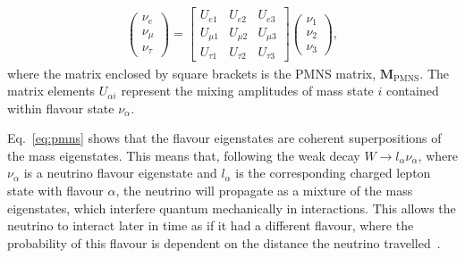 \documentclass[aps,pra,12pt,notitlepage,tightenlines]{revtex4-1}
\newcommand\matr[1]{\bm{#1}}
\begin{document}
\begin{gather}
\label{eq:pmns}
 \begin{pmatrix}
 \nu_e \\
 \nu_\mu \\
 \nu_\tau 
 \end{pmatrix}
 =
 \begin{bmatrix}
 U_{e1} & U_{e2} & U_{e3} \\
 U_{\mu1} & U_{\mu2} & U_{\mu3} \\
 U_{\tau1} & U_{\tau2} & U_{\tau3}
 \end{bmatrix}
 \begin{pmatrix}
  \nu_1 \\
 \nu_2 \\
 \nu_3 
 \end{pmatrix}
 ,
\end{gather}
where the matrix enclosed by square brackets is the PMNS matrix, $\matr{M}_\mathrm{PMNS}$. The matrix elements $U_{\alpha i}$ represent the mixing amplitudes of mass state $i$ contained within flavour state $\nu_\alpha$.

Eq.\ \eqref{eq:pmns} shows that the flavour eigenstates are coherent superpositions of the mass eigenstates. This means that, following the weak decay $W \rightarrow l_\alpha\nu_\alpha$, where $\nu_\alpha$ is a neutrino flavour eigenstate and $l_\alpha$ is the corresponding charged lepton state with flavour $\alpha$, the neutrino will propagate as a mixture of the mass eigenstates, which interfere quantum mechanically in interactions. This allows the neutrino to interact later in time as if it had a different flavour, where the probability of this flavour is dependent on the distance the neutrino travelled~\cite{Kayser:2005cd}. 
\end{document}
